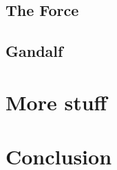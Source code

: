 \documentclass{smujour}
\begin{document}
\subsection{The Force}
\lipsum[39]

\subsection{Gandalf}
\lipsum[48-49]



\section{More stuff}
\lipsum[88-95]



\section{Conclusion}
\lipsum[32]



\end{document}
